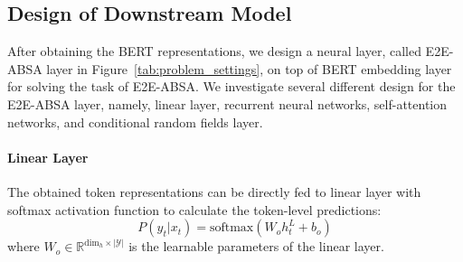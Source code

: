 \documentclass[11pt,a4paper]{article}
\begin{document}
\subsection{Design of Downstream Model}
After obtaining the BERT representations, we design a neural layer, called E2E-ABSA layer in Figure~\ref{tab:problem_settings}, on top of BERT embedding layer for solving the task of E2E-ABSA. We investigate several different design for the E2E-ABSA layer, namely, linear layer, recurrent neural networks, self-attention networks, and conditional random fields layer. 
\paragraph{Linear Layer} The obtained token representations can be directly fed to linear layer with softmax activation function to calculate the token-level predictions:
\begin{equation}
    P(y_t|x_t) = \text{softmax}(W_o h^L_t + b_o) 
\end{equation}
where $W_o \in \mathbb{R}^{\mathrm{dim}_h \times |\mathcal{Y}|}$ is the learnable parameters of the linear layer. 
\end{document}
